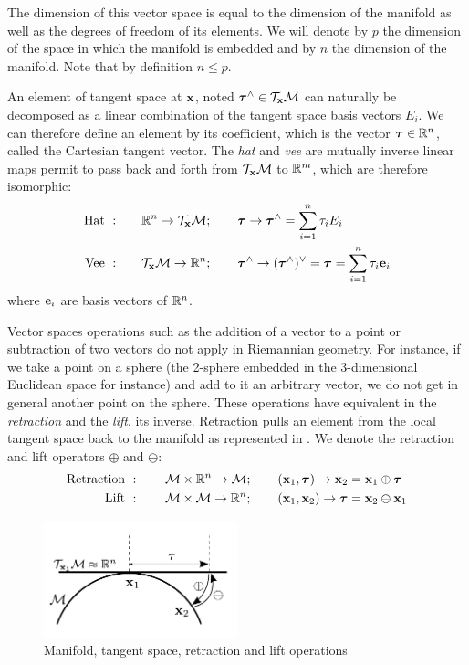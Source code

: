 The dimension of this vector space is equal to the dimension of the manifold as well as the degrees of freedom of its elements.
We will denote by $p$ the dimension of the space in which the manifold is embedded and by $n$ the dimension of the manifold.
Note that by definition $n \leq p$.  

An element of tangent space at ${\bf x}$, noted ${\bm \tau}^\wedge \in \mathcal{T}_{{\bf x}}\mathcal{M}$ can naturally be decomposed as a linear combination 
of the tangent space basis vectors $E_i$. We can therefore define an element by its coefficient, which is the vector ${\bm \tau} \in \mathbb{R}^n$, called the Cartesian tangent vector.
The \textit{hat} and \textit{vee} are mutually inverse linear maps permit to pass back and forth from $\mathcal{T}_{{\bf x}}\mathcal{M}$ to $\mathbb{R}^m$, which are therefore isomorphic:
%
\begin{align}
    \text{Hat} ~ :& \quad\quad \mathbb{R}^n \rightarrow \mathcal{T}_{{\bf x}}\mathcal{M}; \quad\quad {\bm \tau} \rightarrow {\bm \tau}^\wedge = \sum_{i=1}^n\tau_i E_i  \\
    \text{Vee} ~ :& \quad\quad \mathcal{T}_{{\bf x}}\mathcal{M} \rightarrow \mathbb{R}^n; \quad\quad {\bm \tau}^\wedge \rightarrow ({\bm \tau}^\wedge)^\vee = {\bm \tau} = \sum_{i=1}^n\tau_i {\bf e}_i
\end{align}
%
where ${\bf e}_i$ are basis vectors of $\mathbb{R}^n$.

Vector spaces operations such as the addition of a vector to a point or subtraction of two vectors do not apply in Riemannian geometry. For instance, if we
take a point on a sphere (the 2-sphere embedded in the 3-dimensional Euclidean space for instance) and add to it an arbitrary vector, we do not get in general
another point on the sphere. These operations have equivalent in the \textit{retraction} and the \textit{lift}, its inverse.
Retraction pulls an element from the local tangent space back to the manifold as represented in . We denote the retraction and lift operators 
$\oplus$ and $\ominus$:
%
\begin{align}
    \text{Retraction}~&: \quad\quad \mathcal{M} \times \mathbb{R}^n \rightarrow \mathcal{M}; \quad\quad ({\bf x}_1,{\bm \tau}) \rightarrow {\bf x}_2 = {\bf x}_1 \oplus {\bm \tau}   \\
    \text{Lift}~      &: \quad\quad \mathcal{M} \times \mathcal{M} \rightarrow \mathbb{R}^n; \quad\quad ({\bf x}_1,{\bf x}_2) \rightarrow {\bm \tau} = {\bf x}_2 \ominus {\bf x}_1
\end{align}


\begin{figure}[h]
    \centering
    \includegraphics[width=0.5\textwidth]{figures/manifold.pdf}
    \caption{Manifold, tangent space, retraction and lift operations}
    \label{fig:manifold}
\end{figure}

